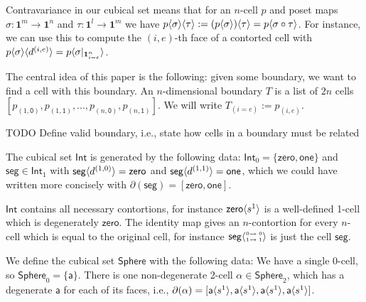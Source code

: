 \documentclass{llncs}
\newcommand{\todo}[1]{
  \begin{tcolorbox}
    TODO {#1} 
  \end{tcolorbox}
}
\newcommand{\mdef}{:=}
\newcommand{\mlist}[1]{[ {#1} ]}
\newcommand{\pint}[1]{\mathbf{1}^{#1}}
\newcommand{\pintrestr}[3]{\mathbf{1}^{#1}_{{#2}={#3}}}
\newcommand{\izero}{\mathsf{0}}
\newcommand{\ione}{\mathsf{1}}
\newcommand{\restrict}[2]{{#1}|_{#2}}
\newcommand{\smap}[1]{s^{{#1}}}
\newcommand{\dmap}[2]{d^{({#1} , {#2})}}
\newcommand{\cont}[2]{\ensuremath{ \ifthenelse{\equal{#2}{}}{#1}{{#1}\langle{#2}\rangle}} }
\newcommand{\boundaryface}[3]{{#1}_{({#2}={#3})}}
\newcommand{\cset}[1]{\ensuremath{\mathsf{{#1}}}}
\newcommand{\boundary}[1]{\partial({#1})}
\newcommand{\substtwo}[2]{\tiny
  \arraycolsep=.4pt\def\arraystretch{1}
  \begin{array}{ll}
    0 &\mapsto {#1} \\
    1 &\mapsto {#2}
  \end{array}
}
\newcommand{\oneid}{\substtwo{0}{1}}
\begin{document}

Contravariance in our cubical set means that for an $n$-cell $p$ and poset maps
$\sigma : \pint{m} \to \pint{n}$ and $\tau : \pint{l} \to \pint{m}$ we have 
$\cont{\cont{p}{\sigma}}{\tau} \mdef \cont{(\cont{p}{\sigma})}{\tau} =
\cont{p}{\sigma \circ \tau}$. For instance, we can use this to compute the
$(i,e)$-th face of a contorted cell with $\cont{\cont{p}{\sigma}}{\dmap{i}{e}} =
\cont{p}{\restrict{\sigma}{\pintrestr{n}{i}{e}}}$.

The central idea of this paper is the following: given some boundary, we want to
find a cell with this boundary. 
An $n$-dimensional boundary $T$ is a list of $2n$ cells $\mlist{p_{(1,\izero)},
  p_{(1,\ione)} , ... , p_{(n,\izero)}, p_{(n, \ione)}}$. We will write
$\boundaryface{T}{i}{e} \mdef p_{(i,e)}$.

\todo{Define valid boundary, i.e., state how cells in a boundary must be related}


\begin{example}\label{exp:int}
  The cubical set $\cset{Int}$ is generated by the following data: $\cset{Int}_0
  = \{ \cset{zero} , \cset{one} \}$ and $\cset{seg} \in \cset{Int}_1$ with
  $\cont{\cset{seg}}{\dmap{1}{0}} = \cset{zero}$ and $\cont{\cset{seg}}{\dmap{1}{1}} =
  \cset{one}$, which we could have written more concisely with
  $\boundary{\cset{seg}} = \mlist{\cset{zero}, \cset{one}}$.

  $\cset{Int}$ contains all necessary contortions, for instance
  $\cont{\cset{zero}}{\smap{1}}$ is a well-defined 1-cell which is
  degenerately $\cset{zero}$.
  The identity map gives an $n$-contortion for every $n$-cell which is equal
  to the original cell, for instance $\cont{\cset{seg}}{\oneid}$ is just the cell
  $\cset{seg}$.
\end{example}

\begin{example}\label{exp:sndsphere}
  We define the cubical set $\cset{Sphere}$ with the following data: We have a
  single 0-cell, so $\cset{Sphere}_0 = \{
  \cset{a} \}$. There is one non-degenerate 2-cell $\cset{\alpha} \in
  \cset{Sphere}_2$, which has a degenerate $\cset{a}$ for each of its faces,
  i.e.,
  $\boundary{\cset{\alpha}} = \mlist{ \cont{\cset{a}}{\smap{1}},
    \cont{\cset{a}}{\smap{1}}, \cont{\cset{a}}{\smap{1}}, \cont{\cset{a}}{\smap{1}} }$.
\end{example}
\end{document}
